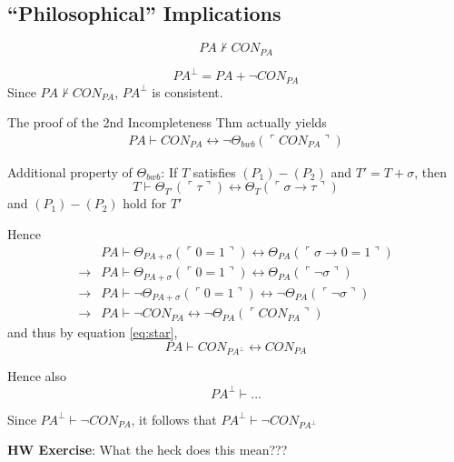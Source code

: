 \documentclass[12pt]{article}
\newcommand{\proves}{\vdash}
\newcommand{\gn}[1]{\ulcorner #1 \urcorner}
\begin{document}
\subsection*{``Philosophical'' Implications}
\[
PA \not\proves CON_{PA}
\]

\[
  PA^\bot = PA + \neg CON_{PA}
\]
Since $PA \not\proves CON_{PA}$, $PA^\bot$ is consistent.

The proof of the 2nd Incompleteness Thm actually yields
\begin{align}
  PA \proves CON_{PA} \leftrightarrow \neg \Theta_{bwb}(\gn{CON_{PA}})
  \label{eq:star}
\end{align}

Additional property of $\Theta_{bwb}$:
%
If $T$ satisfies $(P_1)-(P_2)$
and $T' = T + \sigma$, then
\[
T \proves \Theta_{T'}(\gn{\tau}) \leftrightarrow \Theta_T(\gn{\sigma \rightarrow \tau})
\]
and $(P_1)-(P_2)$ hold for $T'$

Hence 
\begin{align*}
  &PA \proves \Theta_{PA+\sigma}(\gn{0=1}) \leftrightarrow \Theta_{PA}(\gn{\sigma \rightarrow 0 = 1}) \\
 \rightarrow
  &PA \proves \Theta_{PA+\sigma}(\gn{0=1}) \leftrightarrow \Theta_{PA}(\gn{\neg \sigma}) \\
 \rightarrow
  &PA \proves \neg \Theta_{PA+\sigma}(\gn{0=1}) \leftrightarrow \neg \Theta_{PA}(\gn{\neg \sigma}) \\
 \rightarrow
 &PA \proves \neg CON_{PA} \leftrightarrow \neg \Theta_{PA}(\gn{CON_{PA}})
\end{align*}
and thus by equation \ref{eq:star},
\[
PA \proves CON_{PA^\bot} \leftrightarrow CON_{PA}
\]

Hence also \[
 PA^\bot \proves \dots
\]

Since $PA^\bot \proves \neg CON_{PA}$,
it follows that $PA^\bot \proves \neg CON_{PA^\bot}$

\textbf{HW Exercise}: What the heck does this mean???
\end{document}
